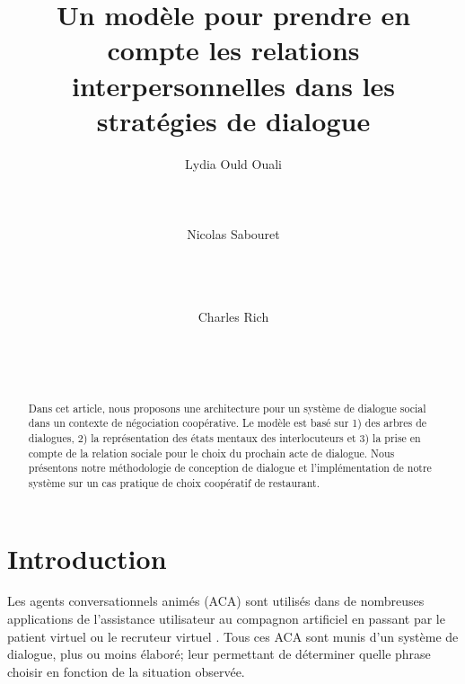 \documentclass [french]{sig-alternate-05-2015}
\begin{document}
\title{Un modèle pour prendre en compte les relations interpersonnelles dans les stratégies de dialogue}



\author{
\alignauthor Lydia Ould Ouali\\
       \\
       \\
       \\
\alignauthor Nicolas Sabouret\\
       \\
       \\
       \\
        \and
\alignauthor Charles Rich\\
       \\
       \\
       \\
}


\maketitle
\begin{abstract}
\par Dans cet article, nous proposons une architecture pour un système de dialogue social dans un contexte de négociation coopérative. Le modèle est basé sur 1) des arbres de dialogues, 2) la représentation des états mentaux des interlocuteurs et 3) la prise en compte de la relation sociale pour le choix du prochain acte de dialogue. Nous présentons notre méthodologie de conception de dialogue et l'implémentation de notre système sur un cas pratique de choix coopératif de restaurant.
\end{abstract}



\section{Introduction}


Les agents conversationnels animés (ACA) sont utilisés dans de nombreuses applications de l'assistance utilisateur \cite{sidner2013always} au compagnon artificiel \cite{sidner2013always, riviere2014aca} en passant par le patient virtuel \cite{annesysteme} ou le recruteur virtuel \cite{jones2012affective}. Tous ces ACA sont munis d'un système de dialogue, plus ou moins élaboré; leur permettant de déterminer quelle phrase choisir en fonction de la situation observée.
\end{document}
